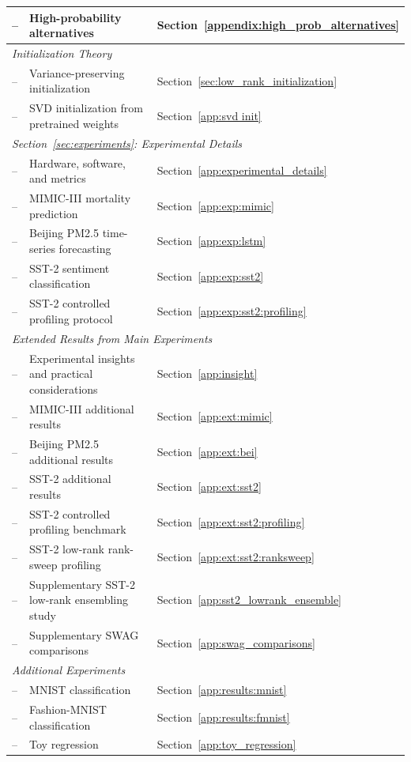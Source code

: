 \documentclass{article}
\theoremstyle{plain}
\theoremstyle{definition}
\theoremstyle{remark}
\begin{document}
\begin{table}[h]
\begin{tabular}{lll}
-- & High-probability alternatives & Section~\ref{appendix:high_prob_alternatives} \\
\midrule
\multicolumn{3}{l}{\textit{Initialization Theory}} \\
-- & Variance-preserving initialization & Section~\ref{sec:low_rank_initialization} \\
-- & SVD initialization from pretrained weights & Section~\ref{app:svd init} \\
\midrule
\multicolumn{3}{l}{\textit{Section~\ref{sec:experiments}: Experimental Details}} \\
-- & Hardware, software, and metrics & Section~\ref{app:experimental_details} \\
-- & MIMIC-III mortality prediction & Section~\ref{app:exp:mimic} \\
-- & Beijing PM2.5 time-series forecasting & Section~\ref{app:exp:lstm} \\
-- & SST-2 sentiment classification & Section~\ref{app:exp:sst2} \\
-- & SST-2 controlled profiling protocol & Section~\ref{app:exp:sst2:profiling} \\

\midrule
\multicolumn{3}{l}{\textit{Extended Results from Main Experiments}} \\
-- & Experimental insights and practical considerations & Section~\ref{app:insight} \\
-- & MIMIC-III additional results & Section~\ref{app:ext:mimic} \\
-- & Beijing PM2.5 additional results & Section~\ref{app:ext:bei} \\
-- & SST-2 additional results & Section~\ref{app:ext:sst2} \\
-- & SST-2 controlled profiling benchmark & Section~\ref{app:ext:sst2:profiling} \\
-- & SST-2 low-rank rank-sweep profiling & Section~\ref{app:ext:sst2:ranksweep} \\
-- & Supplementary SST-2 low-rank ensembling study & Section~\ref{app:sst2_lowrank_ensemble} \\
-- & Supplementary SWAG comparisons & Section~\ref{app:swag_comparisons} \\


\midrule
\multicolumn{3}{l}{\textit{Additional Experiments}} \\
-- & MNIST classification & Section~\ref{app:results:mnist} \\
-- & Fashion-MNIST classification & Section~\ref{app:results:fmnist} \\
-- & Toy regression & Section~\ref{app:toy_regression} \\
\bottomrule
\end{tabular}
\end{table}
\end{document}

